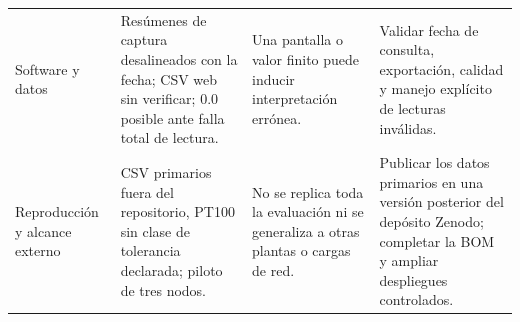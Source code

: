 \begin{longtable}{@{}>{\raggedright\arraybackslash}p{2.4cm}>{\raggedright\arraybackslash}p{4.8cm}>{\raggedright\arraybackslash}p{3.7cm}>{\raggedright\arraybackslash}p{3.7cm}@{}}
Software y datos & Resúmenes de captura desalineados con la fecha; CSV web sin verificar; 0.0 posible ante falla total de lectura. & Una pantalla o valor finito puede inducir interpretación errónea. & Validar fecha de consulta, exportación, calidad y manejo explícito de lecturas inválidas. \\
Reproducción y alcance externo & CSV primarios fuera del repositorio, PT100 sin clase de tolerancia declarada; piloto de tres nodos. & No se replica toda la evaluación ni se generaliza a otras plantas o cargas de red. & Publicar los datos primarios en una versión posterior del depósito Zenodo; completar la BOM y ampliar despliegues controlados. \\
\end{longtable}
\endgroup
